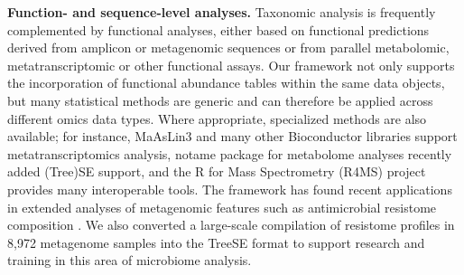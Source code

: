 \documentclass[
  sn-nature,
]{sn-jnl}
\begin{document}
\textbf{Function- and sequence-level analyses.} Taxonomic analysis is
frequently complemented by functional analyses, either based on
functional predictions derived from amplicon or metagenomic sequences or
from parallel metabolomic, metatranscriptomic or other functional
assays. Our framework not only supports the incorporation of functional
abundance tables within the same data objects, but many statistical
methods are generic and can therefore be applied across different omics
data types. Where appropriate, specialized methods are also available;
for instance, MaAsLin3 \citep{nickols2026} and many other Bioconductor
libraries support metatranscriptomics analysis, notame package
\citep{klavus2020} for metabolome analyses recently added (Tree)SE
support, and the R for Mass Spectrometry (R4MS) project provides many
interoperable tools. The framework has found recent applications in
extended analyses of metagenomic features such as antimicrobial
resistome composition \citep{salehi2025}. We also converted a
large-scale compilation of resistome profiles in 8,972 metagenome
samples \citep{lee2023} into the TreeSE format to support research and
training in this area of microbiome analysis.
\end{document}
